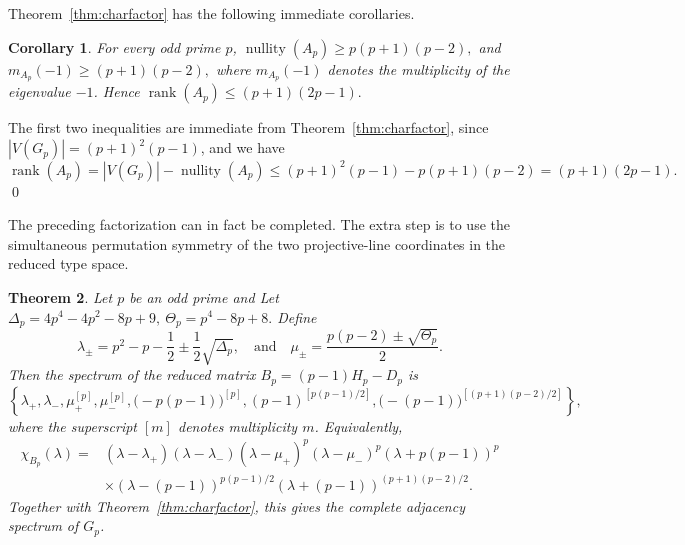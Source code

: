 \documentclass[12pt]{article}
\renewenvironment{proof}{{\bf \noindent Proof.}}{\qed}
\newtheorem{theorem}{Theorem}[section]
\newtheorem{corollary}[theorem]{Corollary}
\theoremstyle{definition}
\newcommand{\rank}{\operatorname{rank}}
\newcommand{\nullity}{\operatorname{nullity}}
\begin{document}
	\medskip
	Theorem~\ref{thm:charfactor} has the following immediate corollaries.
	
	\begin{corollary}\label{cor:nullity}
		For every odd prime $p$, $\nullity(A_p)\ge p(p+1)(p-2),$ and $m_{A_p}(-1)\ge (p+1)(p-2),$ where $m_{A_p}(-1)$ denotes the multiplicity of the eigenvalue $-1$. 	Hence $\rank(A_p)\le (p+1)(2p-1).$
	\end{corollary}
	
	\begin{proof}
		The first two inequalities are immediate from Theorem~\ref{thm:charfactor}, since $|V(G_p)|=(p+1)^2(p-1)$, and we have
		$$
		\rank(A_p)=|V(G_p)|-\nullity(A_p)
		\le (p+1)^2(p-1)-p(p+1)(p-2)
		=(p+1)(2p-1).
		$$
	\end{proof}
	
	\medskip
	The preceding factorization can in fact be completed. The extra step is to use the simultaneous permutation symmetry of the two projective-line coordinates in the reduced type space.
	
	\begin{theorem}\label{thm:fullreducedspectrum}
		Let $p$ be an odd prime and Let
		$
		\Delta_p=4p^4-4p^2-8p+9,~
		\Theta_p=p^4-8p+8.
		$
		Define
		$$
		\lambda_{\pm}=p^2-p-\frac12\pm\frac12\sqrt{\Delta_p},
		\quad
		\text{and}
		\quad
		\mu_{\pm}=\frac{p(p-2)\pm\sqrt{\Theta_p}}{2}.
		$$
		Then the spectrum of the reduced matrix $B_p=(p-1)H_p-D_p$ is
		$$
		\left\{
		\lambda_+,\lambda_-,
		\mu_+^{[p]},\mu_-^{[p]},
		\bigl(-p(p-1)\bigr)^{[p]},
		(p-1)^{[p(p-1)/2]},
		\bigl(-(p-1)\bigr)^{[(p+1)(p-2)/2]}
		\right\},
		$$
		where the superscript $[m]$ denotes multiplicity $m$. Equivalently,
		$$
		\begin{aligned}
			\chi_{B_p}(\lambda)
			={}&(\lambda-\lambda_+)(\lambda-\lambda_-)
			(\lambda-\mu_+)^p(\lambda-\mu_-)^p
			(\lambda+p(p-1))^p\\
			&\times(\lambda-(p-1))^{p(p-1)/2}
			(\lambda+(p-1))^{(p+1)(p-2)/2}.
		\end{aligned}
		$$
		Together with Theorem~\ref{thm:charfactor}, this gives the complete adjacency spectrum of $G_p$.
	\end{theorem}
	
\end{document}
